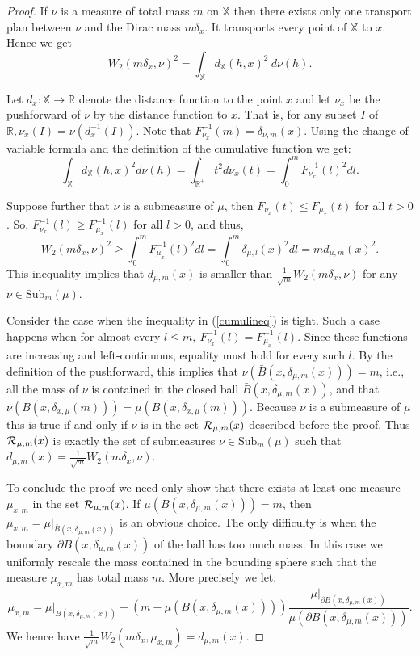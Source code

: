 \documentclass[a4paper]{article}
\newcommand\dm{d_{\mu,m}}
\newcommand\X{\mathbb{X}}
\newcommand\R{\mathbb{R}}
\newcommand\dX[2]{d_\X(#1,#2)}
\newcommand\Sub[2]{\mathrm{Sub}_#1(#2)}
\begin{document}
\begin{proof}
If $\nu$ is a measure of total mass $m$ on $\X$ then there exists only one transport plan between $\nu$ and the Dirac mass $m\delta_x$.
It transports every point of $\X$ to $x$.
Hence we get
\[
  W_2(m\delta_x,\nu)^2=\int_{\X}\dX{h}{x}^2\ d\nu(h).
\]

Let $d_x:\X\rightarrow\R$ denote the distance function to the point $x$ and let $\nu_x$ be the pushforward of $\nu$ by the distance function to $x$.
That is, for any subset $I$ of $\R, \nu_x(I)=\nu(d_x^{-1}(I))$. 
Note that $F^{-1}_{\nu_x}(m)=\delta_{\nu,m}(x)$.
Using the change of variable formula and the definition of the cumulative function we get:
$$\int_{\X}\dX{h}{x}^2d\nu(h)=\int_{\R^+} t^2d\nu_x(t)=\int_0^mF_{\nu_x}^{-1}(l)^2dl.$$

Suppose further that $\nu$ is a submeasure of $\mu$, then $F_{\nu_x}(t)\leq F_{\mu_x}(t)$ for all $t>0$. 
So, $F_{\nu_x}^{-1}(l)\geq F_{\mu_x}^{-1}(l)$ for all $l> 0$, and thus,
\begin{equation}\label{cumulineq}
  W_2(m\delta_x,\nu)^2\geq\int_0^mF_{\mu_x}^{-1}(l)^2dl=\int_0^m\delta_{\mu,l}(x)^2dl=m\dm(x)^2.
\end{equation}
This inequality implies that $\dm(x)$ is smaller than $\frac{1}{\sqrt{m}}W_2(m\delta_x,\nu)$ for any $\nu\in\Sub{m}{\mu}$.

Consider the case when the inequality in (\ref{cumulineq}) is tight.
Such a case happens when for almost every $l\leq m,\ F_{\nu_x}^{-1}(l)=F_{\mu_x}^{-1}(l)$.
Since these functions are increasing and left-continuous, equality must hold for every such $l$.
By the definition of the pushforward, this implies that $\nu(\bar{B}(x,\delta_{\mu,m}(x)))=m$, i.e., all the mass of $\nu$ is contained in the closed ball $\bar{B}(x,\delta_{\mu,m}(x))$, and that $\nu(B(x,\delta_{x,\mu}(m)))=\mu(B(x,\delta_{x,\mu}(m)))$.
Because $\nu$ is a submeasure of $\mu$ this is true if and only if $\nu$ is in the set ${\cal R}_{\mu,m}(x)$ described before the proof.
Thus ${\cal R}_{\mu,m}(x)$ is exactly the set of submeasures $\nu\in\Sub{m}{\mu}$ such that $\dm(x)=\frac{1}{\sqrt{m}}W_2(m\delta_x,\nu)$.

To conclude the proof we need only show that there exists at least one measure $\mu_{x,m}$ in the set ${\cal R}_{\mu,m}(x)$.
If $\mu(\bar{B}(x,\delta_{\mu,m}(x)))=m$, then $\mu_{x,m}=\mu|_{\bar{B}(x,\delta_{\mu,m}(x))}$ is an obvious choice.
The only difficulty is when the boundary $\partial B(x,\delta_{\mu,m}(x))$ of the ball has too much mass.
In this case we uniformly rescale the mass contained in the bounding sphere such that the measure $\mu_{x,m}$ has total mass $m$. 
More precisely we let:
$$\mu_{x,m}=\mu|_{B(x,\delta_{\mu,m}(x))}+(m-\mu(B(x,\delta_{\mu,m}(x))))\frac{\mu|_{\partial B(x,\delta_{\mu,m}(x))}}{\mu(\partial B(x,\delta_{\mu,m}(x)))}.$$
We hence have $\frac{1}{\sqrt{m}}W_2(m\delta_x,\mu_{x,m})=\dm(x)$.
\end{proof}
\end{document}
